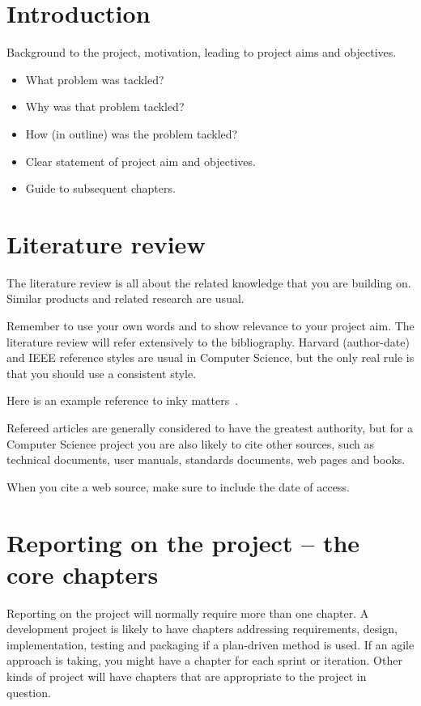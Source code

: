\documentclass{main}
\begin{document}
\chapter{Introduction}

Background to the project, motivation, leading to project aims and objectives.
\begin{itemize}
  \item What problem was tackled?
  \item Why was that problem tackled?
  \item How (in outline) was the problem tackled?
  \item Clear statement of project aim and objectives.
  \item Guide to subsequent chapters.
\end{itemize}

\chapter{Literature review}

The literature review is all about the related knowledge that you are building on.  Similar products and related research are usual.

Remember to use your own words and to show relevance to your project aim.
The literature review will refer extensively to the bibliography.  Harvard (author-date) and IEEE reference styles are usual in Computer Science, but the only real rule is that you should use a consistent style.

Here is an example reference to inky matters~\cite{Jones2010}.

Refereed articles are generally considered to have the greatest authority, but for a Computer Science project you are also likely to cite other sources, such as technical documents, user manuals, standards documents, web pages and books.

When you cite a web source, make sure to include the date of access.

\chapter{Reporting on the project -- the core chapters}

Reporting on the project will normally require more than one chapter.
A development project is likely to have chapters addressing requirements, design, implementation, testing and packaging if a plan-driven method is used.  If an agile approach is taking, you might have a chapter for each sprint or iteration.
Other kinds of project will have chapters that are appropriate to the project in question.
\end{document}
